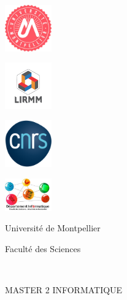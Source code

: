\newcommand\interline{0.3cm}
\thispagestyle{empty}
\begin{titlepage}
\framethispage[1.9cm]%
\begin{center}

\vspace{1cm}
\begin{minipage}[b]{3.5cm}
\includegraphics[width=2cm]{LOGO_RVB_grand-UM.jpg}
\end{minipage}\begin{minipage}[b]{3.5cm}

\includegraphics[width=2cm]{lirmm.fr.png}
\end{minipage}\begin{minipage}[b]{3.5cm}

\includegraphics[width=2cm]{logo.png}
\end{minipage}\begin{minipage}[b]{3cm}

\includegraphics[width=2cm]{LOGO_DTP_INFORMATIQUE.jpg}
\end{minipage}
\vspace{1cm}

\Large{Université de Montpellier\\
\vspace{\interline}

Faculté des Sciences} \\
\vspace{2cm}

{\huge MASTER 2 INFORMATIQUE \\
\vspace{\interline}

}
\end{center}
\end{titlepage}
